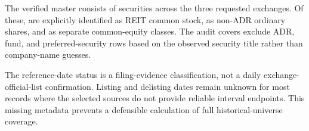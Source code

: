 
The verified master consists of \IncludedSecurities{} securities across the three requested exchanges. Of these, \ReitCount{} are explicitly identified as REIT common stock, \OrdinarySharesCount{} as non-ADR ordinary shares, and \CommonClassCount{} as separate common-equity classes. The audit covers exclude \AdrExcluded{} ADR, \FundExcluded{} fund, and \PreferredExcluded{} preferred-security rows based on the observed security title rather than company-name guesses.

The reference-date status is a filing-evidence classification, not a daily exchange-official-list confirmation. Listing and delisting dates remain unknown for most records where the selected sources do not provide reliable interval endpoints. This missing metadata prevents a defensible calculation of full historical-universe coverage.
